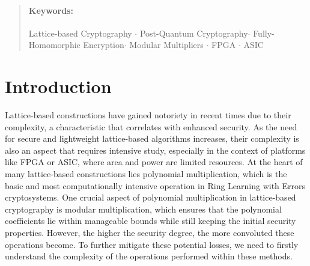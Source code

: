\documentclass[11pt,
  titlepage=false,
  abstract=on,
]{scrreprt}
\begin{document}
\begin{abstract}



\paragraph*{Keywords:}
Lattice-based Cryptography $\cdot$
Post-Quantum Cryptography$\cdot$
Fully-Homomorphic Encryption$\cdot$
Modular Multipliers $\cdot$
FPGA $\cdot$
ASIC
\end{abstract}

\clearpage



\section{Introduction}
\label{sec:introduction}

Lattice-based constructions have gained notoriety in recent times due to their complexity, a characteristic that correlates with enhanced security.
As the need for secure and lightweight lattice-based algorithms increases, their complexity is also an aspect that requires intensive study, especially
in the context of platforms like FPGA or ASIC, where area and power are limited resources.
At the heart of many lattice-based constructions lies polynomial multiplication, which is the basic and most computationally intensive operation in 
Ring Learning with Errors cryptosystems. One crucial aspect of polynomial multiplication in lattice-based cryptography is modular multiplication, which 
ensures that the polynomial coefficients lie within manageable bounds while still keeping the initial security properties. However, the higher the security 
degree, the more convoluted these operations become. To further mitigate these potential losses, we need to firstly understand the complexity of the operations
performed within these methods.
\end{document}
